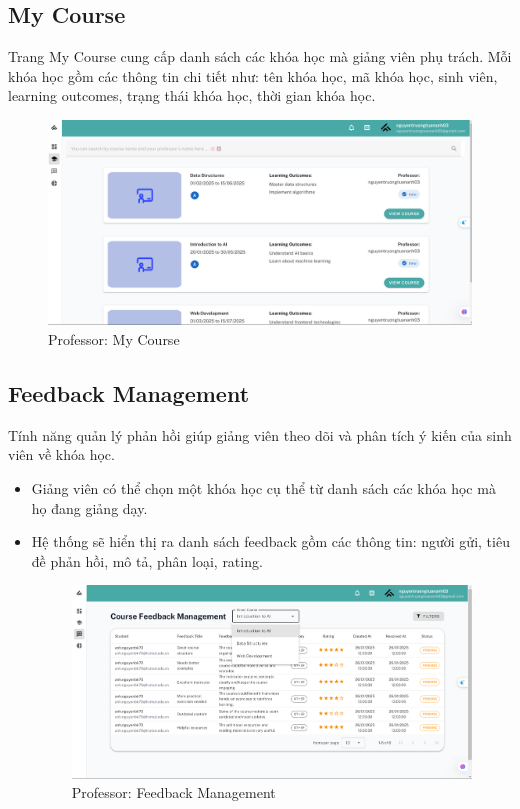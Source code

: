 \subsection{My Course}
Trang My Course cung cấp danh sách các khóa học mà giảng viên phụ trách. Mỗi khóa học gồm các thông tin chi tiết như: tên khóa học, mã khóa học, sinh viên, learning outcomes, trạng thái khóa học, thời gian khóa học.
\begin{figure}[H]
        \centering
        \includegraphics[width=0.8\linewidth]{images/course_professor.png}
        \caption{Professor: My Course}
        \label{fig:enter-label}
    \end{figure}
\subsection{Feedback Management}
Tính năng quản lý phản hồi giúp giảng viên theo dõi và phân tích ý kiến của sinh viên về khóa học.
\begin{itemize}
    \item Giảng viên có thể chọn một khóa học cụ thể từ danh sách các khóa học mà họ đang giảng dạy.
    \item Hệ thống sẽ hiển thị ra danh sách feedback gồm các thông tin: người gửi, tiêu đề phản hồi, mô tả, phân loại, rating.
    \begin{figure}[H]
        \centering
        \includegraphics[width=0.8\linewidth]{images/feedback_professor.png}
        \caption{Professor: Feedback Management}
        \label{fig:enter-label}
    \end{figure}
\end{itemize}
